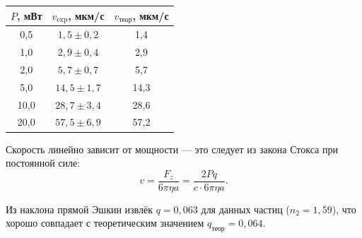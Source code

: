 \documentclass[a4paper]{article}
\begin{document}
\begin{center}
\begin{tabular}{ccc}
\hline
$P$, мВт & $v_{\text{exp}}$, мкм/с & $v_{\text{теор}}$, мкм/с \\
\hline
0,5 & $1{,}5 \pm 0{,}2$ & 1,4 \\
1,0 & $2{,}9 \pm 0{,}4$ & 2,9 \\
2,0 & $5{,}7 \pm 0{,}7$ & 5,7 \\
5,0 & $14{,}5 \pm 1{,}7$ & 14,3 \\
10,0 & $28{,}7 \pm 3{,}4$ & 28,6 \\
20,0 & $57{,}5 \pm 6{,}9$ & 57,2 \\
\hline
\end{tabular}
\end{center}

Скорость линейно зависит от мощности — это следует из закона Стокса при постоянной силе:
\[
    v = \frac{F_z}{6\pi\eta a} = \frac{2Pq}{c \cdot 6\pi\eta a}.
\]

Из наклона прямой Эшкин извлёк $q = 0{,}063$ для данных частиц ($n_2 = 1{,}59$), что хорошо совпадает с теоретическим значением $q_{\text{теор}} = 0{,}064$.
\end{document}

